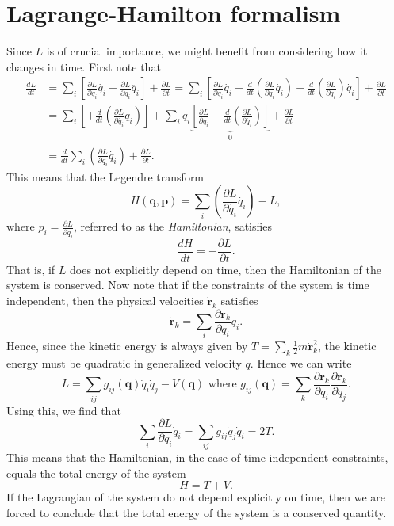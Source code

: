 \documentclass[twoside,utf8]{article}
\begin{document}
\section{Lagrange-Hamilton formalism}

Since $L$ is of crucial importance, we might benefit from considering how it changes in time. First note that
\begin{equation*}
\begin{aligned}
\frac{dL}{dt}
&= \sum_i\left[
 \frac{\partial L}{\partial q_i}\dot{q_i}
+\frac{\partial L}{\partial\dot{q_i}}\ddot{q_i}\right]
+\frac{\partial L}{\partial t}
= \sum_i\left[
\frac{\partial L}{\partial q_i}\dot{q_i}
+\frac{d}{dt}\left(\frac{\partial L}{\partial\dot{q_i}}\dot{q_i}\right)-\frac{d}{dt}\left(\frac{\partial L}{\partial \dot{q_i}}\right)\dot{q_i} \right]
+\frac{\partial L}{\partial t} \\
&=
\sum_i\left[
+\frac{d}{dt}\left(\frac{\partial L}{\partial\dot{q_i}}\dot{q_i}\right)\right]
+
\sum_i \dot{q}_i
\underbrace{\left[
\frac{\partial L}{\partial q_i}-\frac{d}{dt}\left(\frac{\partial L}{\partial \dot{q_i}}\right)\right]}_{0}
+
\frac{\partial L}{\partial t} \\
&=
\frac{d}{dt}\sum_i
\left(\frac{\partial L}{\partial\dot{q_i}}\dot{q_i}\right)
+
\frac{\partial L}{\partial t}.
\end{aligned}
\end{equation*}
This means that the Legendre transform
\[
H(\mathbf{q},\mathbf{p}) = \sum_i\left(\frac{\partial L}{\partial\dot{q_i}}\dot{q_i}\right) - L,
\]
where $p_i=\frac{\partial L}{\partial \dot{q}_i}$, referred to as the {\it Hamiltonian}, satisfies
\[
\frac{dH}{dt} = -\frac{\partial L}{\partial t}.
\]
That is, if $L$ does not explicitly depend on time, then the Hamiltonian of the system is conserved. Now note that if the constraints of the system is time independent, then the physical velocities $\dot{\mathbf{r}}_k$ satisfies
\[
\dot{\mathbf{r}}_k = \sum_i \frac{\partial \mathbf{r}_k}{\partial q_i} q_i.
\]
Hence, since the kinetic energy is always given by $T=\sum_k \frac{1}{2}m\dot{\mathbf{r}}_k^2$, the kinetic energy must be quadratic in generalized velocity $\dot{q}$. Hence we can write
\[
L = \sum_{ij}g_{ij}(\mathbf{q})\dot{q}_i\dot{q}_j - V(\mathbf{q})
\text{ where }
g_{ij}(\mathbf{q}) = \sum_{k} \frac{\partial \mathbf{r}_k}{\partial q_i} \frac{\partial \mathbf{r}_k}{\partial q_j}.
\]
Using this, we find that
\[
\sum_i \frac{\partial L}{\partial \dot{q}_i} \dot{q}_i
=
\sum_{ij} g_{ij} \dot{q}_j \dot{q}_i
= 2T.
\]
This means that the Hamiltonian, in the case of time independent constraints, equals the total energy of the system
\[
H = T+V.
\]
If the Lagrangian of the system do not depend explicitly on time, then we are forced to conclude that the total energy of the system is a conserved quantity.
\end{document}
